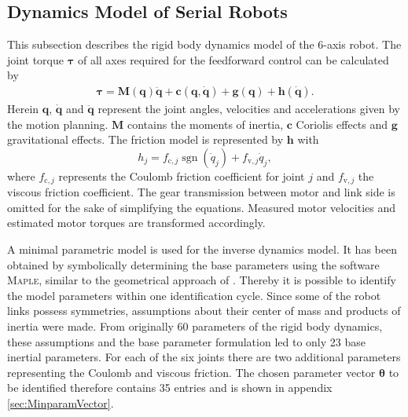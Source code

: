 
\subsection{Dynamics Model of Serial Robots}
This subsection describes the rigid body dynamics model of the 6-axis robot.
The joint torque $\boldsymbol{\tau}$ of all axes required for the feedforward control can be calculated by
%
\begin{equation}
\label{eq:model_equation1}
\begin{split}
\boldsymbol{\tau}=
\boldsymbol{M}(\boldsymbol{q}) \ddot{\boldsymbol{q}}+\boldsymbol{c}(\boldsymbol{q}, \dot{\boldsymbol{q}})+\boldsymbol{g}(\boldsymbol{q})+\boldsymbol{h}(\dot{\boldsymbol{q}}).
\end{split}
\end{equation}
%
Herein $\boldsymbol{q}$, $\dot{\boldsymbol{q}}$ and $\ddot{\boldsymbol{q}}$ represent the joint angles, velocities and accelerations given by the motion planning. $\boldsymbol{M}$ contains the moments of inertia, $\boldsymbol{c}$ Coriolis effects and $\boldsymbol{g}$ gravitational effects. The friction model is represented by $\boldsymbol{h}$ with
%
\begin{equation}
h_{j}=f_{\mathrm{c}, j} \operatorname{sgn}\left(\dot{{q}}_{j}\right)+f_{\mathrm{v}, j} \dot{q}_{j},
\end{equation}
%
where $f_{\mathrm{c}, j}$ represents the Coulomb friction coefficient for joint $j$ and $f_{\mathrm{v}, j}$ the viscous friction coefficient.
The gear transmission between motor and link side is omitted for the sake of simplifying the equations. Measured motor velocities and estimated motor torques are transformed accordingly.

A minimal parametric model is used for the inverse dynamics  model. 
It has been obtained by symbolically determining the base parameters using the software \textsc{Maple}, similar to the geometrical approach of \cite{Khalil.2006}.
Thereby it is possible to identify the model parameters within one identification cycle.
Since some of the robot links possess symmetries, assumptions about their center of mass and products of inertia were made. From originally 60 parameters of the rigid body dynamics, these assumptions and the base parameter formulation led to only 23 base inertial parameters.
For each of the six joints there are two additional parameters representing the Coulomb and viscous friction. The chosen parameter vector $\boldsymbol{\theta}$ to be identified therefore contains 35 entries and is shown in appendix \ref{sec:MinparamVector}.
